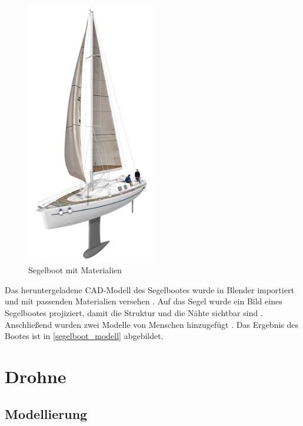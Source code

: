 \begin{figure}[H]
\begin{center}
\includegraphics[width=0.5\textwidth]{gfx/prod/boat/boat.jpg}
\end{center}
\caption{Segelboot mit Materialien}
\label{segelboot_modell}
\end{figure}

Das heruntergeladene CAD-Modell des Segelbootes wurde in Blender importiert und mit passenden Materialien versehen \cite{Sailboat}. Auf das Segel wurde ein Bild eines Segelbootes projiziert, damit die Struktur und die Nähte sichtbar sind \cite{impression}. Anschließend wurden zwei Modelle von Menschen hinzugefügt \cite{people}. Das Ergebnis des Bootes ist in \autoref{segelboot_modell} abgebildet.

\section{Drohne}

\subsection{Modellierung}

